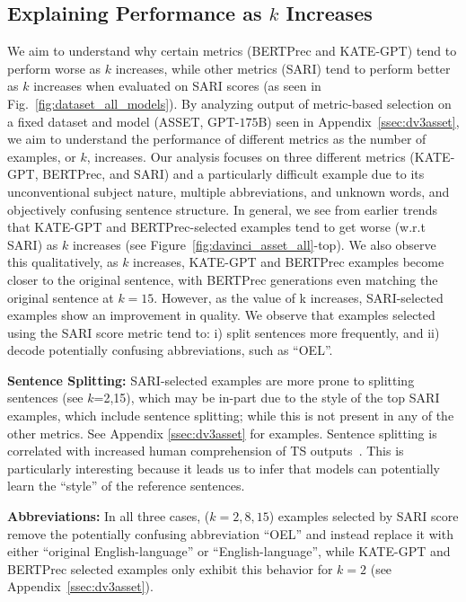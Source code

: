 \documentclass[11pt]{article}
\begin{document}
\subsection{Explaining Performance as $k$ Increases}
We aim to understand why certain metrics (BERTPrec and KATE-GPT) tend to perform worse as $k$ increases, while other metrics (SARI) tend to perform better as $k$ increases when evaluated on SARI scores (as seen in Fig.~\ref{fig:dataset_all_models}).  By analyzing output of metric-based selection on a fixed dataset and model (ASSET, GPT-$175$B) seen in Appendix~\ref{ssec:dv3asset}, we aim to understand the performance of different metrics as the number of examples, or $k$, increases. Our analysis focuses on three different metrics (KATE-GPT, BERTPrec, and SARI) and a particularly difficult example due to its unconventional subject nature, multiple abbreviations, and unknown words, and objectively confusing sentence structure. In general, we see from earlier trends that KATE-GPT and BERTPrec-selected examples tend to get worse (w.r.t SARI) as $k$ increases (see Figure~\ref{fig:davinci_asset_all}-top). We also observe this qualitatively, as $k$ increases, KATE-GPT and BERTPrec examples become closer to the original sentence, with BERTPrec generations even matching the original sentence at $k=15$. However, as the value of k increases, SARI-selected examples show an improvement in quality. We observe that examples selected using the SARI score metric tend to: i) split sentences more frequently, and ii) decode potentially confusing abbreviations, such as ``OEL''.

\textbf{Sentence Splitting: } SARI-selected examples are more prone to splitting sentences (see $k$=2,15), which may be in-part due to the style of the top SARI examples, which include sentence splitting; while this is not present in any of the other metrics. See Appendix \ref{ssec:dv3asset} for examples. Sentence splitting is correlated with increased human comprehension of TS outputs~\cite{williams-etal-2003-experiments}. This is particularly interesting because it leads us to infer that models can potentially learn the ``style'' of the reference sentences. 

\textbf{Abbreviations:} In all three cases, ($k=2,8,15$) examples selected by SARI score remove the potentially confusing abbreviation ``OEL'' and instead replace it with either ``original English-language'' or ``English-language'', while KATE-GPT and BERTPrec selected examples only exhibit this behavior for $k=2$ (see Appendix~\ref{ssec:dv3asset}).
\end{document}
